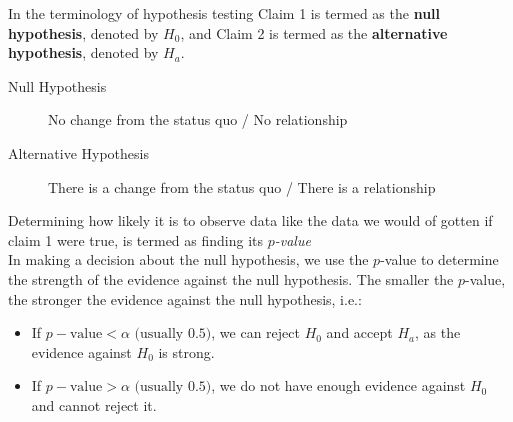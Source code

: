 \documentclass[12pt letter]{report}
\begin{document}
In the terminology of hypothesis testing Claim 1 is termed as the \textbf{null hypothesis}, denoted by $H_0$, and Claim
2 is termed as the \textbf{alternative hypothesis}, denoted by $H_a$.

\begin{description}
  \item[Null Hypothesis] No change from the status quo / No relationship
  \item[Alternative Hypothesis] There is a change from the status quo / There is a relationship
\end{description}

Determining how likely it is to observe data like the data we would of gotten if claim 1 were true, is termed as
finding its \textit{$p$-value} \\

In making a decision about the null hypothesis, we use the $p$-value to determine the strength of the evidence against
the null hypothesis. The smaller the $p$-value, the stronger the evidence against the null hypothesis, i.e.:
\begin{itemize}
  \item If $p-\text{value} < \alpha \text{ (usually $0.5$)}$, we can reject $H_0$ and accept $H_{a}$, as the evidence
        against $H_0$ is strong.
  \item If $p-\text{value} > \alpha \text{ (usually $0.5$)}$, we do not have enough evidence against $H_0$ and cannot reject it.
\end{itemize}
\end{document}
